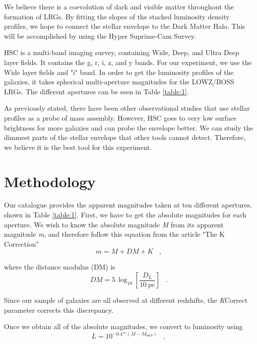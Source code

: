 \documentclass{article}
\begin{document}
We believe there is a coevolution of dark and visible matter throughout the formation of LRGs. By fitting the slopes of the stacked luminosity density profiles, we hope to connect the stellar envelope to the Dark Matter Halo. This will be accomplished by using the Hyper Suprime-Cam Survey.

HSC is a multi-band imaging survey, containing Wide, Deep, and Ultra Deep layer fields. It contains the g, r, i, z, and y bands. For our experiment, we use the Wide layer fields and "i" band. In order to get the luminosity profiles of the galaxies, it takes spherical multi-aperture magnitudes for the LOWZ/BOSS LRGs. The different apertures can be seen in Table \ref{table:1}.

As previously stated, there have been other observational studies that use stellar profiles as a probe of mass assembly. However, HSC goes to very low surface brightness for more galaxies and can probe the envelope better. We can study the dimmest parts of the stellar envelope that other tools cannot detect. Therefore, we believe it is the best tool for this experiment.

\section{Methodology}

Our catalogue provides the apparent magnitudes taken at ten different apertures, shown in Table \ref{table:1}. First, we have to get the absolute magnitudes for each aperture. We wish to know the absolute magnitude \textit{M} from its apparent magnitude \textit{m}, and therefore follow this equation from the article "The K Correction" \cite{Hogg:2002}
\begin{equation}
m=M + DM + K \;\;\;,
\end{equation}

where the distance modulus (DM) is 
\begin{equation}
DM = 5\,\log_{10}\left[\frac{D_L}{10~\mathrm{pc}}\right] \;\;\;.
\end{equation}

Since our sample of galaxies are all observed at different redshifts, the \textit{K}Correct parameter corrects this discrepancy. 

Once we obtain all of the absolute magnitudes, we convert to luminosity using
\begin{equation}
L=10^{-0.4*(\textit{M}-\textit{M}_{bolS})} \;\;\;,
\end{equation}
\end{document}
